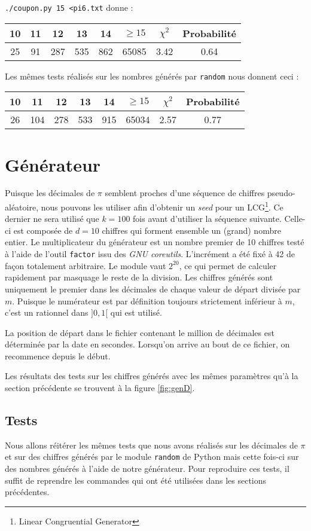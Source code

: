 \documentclass[12pt,a4paper]{article}
\begin{document}
\texttt{./coupon.py 15 <pi6.txt} donne :
\begin{center}
\begin{tabular}{c|c|c|c|c|c|c|c}
10 & 11 & 12 & 13 & 14 & $\geq 15$ & $\chi^2$ & Probabilité \\ \hline
25 & 91 & 287 & 535 & 862 & 65085 &  3.42 &  0.64
\end{tabular}
\end{center}

Les mêmes tests réalisés sur les nombres générés par \texttt{random}
nous donnent ceci :
\begin{center}
\begin{tabular}{c|c|c|c|c|c|c|c}
10 & 11 & 12 & 13 & 14 & $\geq 15$ & $\chi^2$ & Probabilité \\ \hline
26 & 104 & 278 & 533 & 915 & 65034 &  2.57 &  0.77
\end{tabular}
\end{center}

\section{Générateur}
Puisque les décimales de $\pi$ semblent proches d'une séquence de chiffres
pseudo-aléatoire, nous pouvons les utiliser afin d'obtenir un \textit{seed}
pour un LCG\footnote{Linear Congruential Generator}. Ce dernier ne sera utilisé
que $k=100$ fois avant d'utiliser la séquence suivante. Celle-ci est composée de
$d=10$ chiffres qui forment ensemble un (grand) nombre entier.
Le multiplicateur du générateur est un nombre premier de 10 chiffres testé
à l'aide de l'outil \texttt{factor} issu des \textit{GNU coreutils}.
L'incrément a été fixé à 42 de façon totalement arbitraire.
Le module vaut $2^{20}$, ce qui permet de calculer rapidement par masquage
le reste de la division.
Les chiffres générés sont uniquement le premier dans les décimales de chaque
valeur de départ divisée par $m$.
Puisque le numérateur est par définition toujours strictement inférieur à $m$,
c'est un rationnel dans $]0,1[$ qui est utilisé.

La position de départ dans le fichier contenant le million de décimales
est déterminée par la date en secondes. Lorsqu'on arrive au bout de ce fichier,
on recommence depuis le début.

Les résultats des tests sur les chiffres générés avec les mêmes paramètres
qu'à la section précédente se trouvent à la figure \ref{fig:genD}.

\subsection{Tests}
Nous allons réitérer les mêmes tests que nous avons réalisés sur les décimales
de $\pi$ et sur des chiffres générés par le module \texttt{random} de Python
mais cette fois-ci sur des nombres générés à l'aide de notre générateur.
Pour reproduire ces tests, il suffit de reprendre les commandes qui ont été utilisées dans les sections précédentes.
\end{document}
